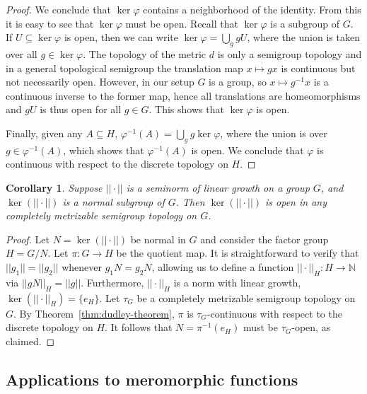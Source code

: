\documentclass[12pt]{paper}
\numberwithin{equation}{section}
\theoremstyle{plain}
\newtheorem{corollary}[theorem]{Corollary}
\theoremstyle{definition}
\newcommand{\N}{\mathbb{N}}
\newcommand{\norm}[1]{||#1||}
\renewcommand{\phi}{\varphi}
\begin{document}
\begin{proof}
  We conclude that \(\ker \phi\) contains a neighborhood of the identity.  From this it is easy to
  see that \(\ker \phi\) must be open.  Recall that \(\ker\phi\) is a subgroup of \(G\).  If
  \(U \subseteq \ker\phi\) is open, then we can write \(\ker\phi = \bigcup_{g} gU\), where the union
  is taken over all \(g \in \ker \phi\).  The topology of the metric \(d\) is only a semigroup
  topology and in a general topological semigroup the translation map \(x \mapsto gx\) is continuous
  but not necessarily open.  However, in our setup \(G\) is a group, so \(x \mapsto g^{-1}x\) is a
  continuous inverse to the former map, hence all translations are homeomorphisms and \(gU\) is thus
  open for all \(g \in G\).  This shows that \(\ker\phi\) is open.

  Finally, given any \(A \subseteq H\), \(\phi^{-1}(A) = \bigcup_{g}g\ker\phi\), where the union is
  over \(g \in \phi^{-1}(A)\), which shows that \(\phi^{-1}(A)\) is open.  We conclude that \(\phi\)
  is continuous with respect to the discrete topology on \(H\).
\end{proof}

\begin{corollary}
  \label{cor:dudley-theorem-open-kernel}
  Suppose \(\norm{\cdot}\) is a seminorm of linear growth on a group \(G\), and
  \(\ker(\norm{\cdot})\) is a normal subgroup of \(G\).  Then \(\ker(\norm{\cdot})\) is open in any
  completely metrizable semigroup topology on \(G\).
\end{corollary}

\begin{proof}
  Let \(N = \ker(\norm{\cdot})\) be normal in \(G\) and consider the factor group \(H = G/N\).  Let
  \(\pi : G \to H\) be the quotient map.  It is straightforward to verify that
  \(\norm{g_{1}} = \norm{g_{2}}\) whenever \(g_{1}N = g_{2}N\), allowing us to define a function
  \(\norm{\cdot}_{H} : H \to \N\) via \(\norm{gN}_{H} = \norm{g}\).  Furthermore,
  \(\norm{\cdot}_{H}\) is a norm with linear growth, \(\ker(\norm{\cdot}_{H}) = \{e_{H}\}\).  Let
  \(\tau_{G}\) be a completely metrizable semigroup topology on \(G\).  By
  Theorem~\ref{thm:dudley-theorem}, \(\pi\) is \(\tau_{G}\)-continuous with respect to the discrete
  topology on \(H\).  It follows that \(N = \pi^{-1}(e_{H})\) must be \(\tau_{G}\)-open, as claimed.
\end{proof}


\subsection{Applications to meromorphic functions}
\label{sec:appl-merom-funct}
\end{document}
